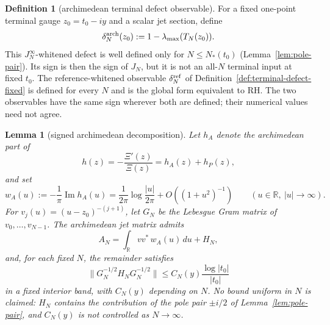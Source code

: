 \documentclass[11pt]{amsart}
\newtheorem{lemma}[theorem]{Lemma}
\theoremstyle{definition}
\newtheorem{definition}[theorem]{Definition}
\theoremstyle{remark}
\theoremstyle{definition}
\renewcommand{\Im}{\operatorname{Im}}
\newcommand{\R}{\mathbb{R}}
\begin{document}
\begin{definition}[archimedean terminal defect observable]\label{def:terminal-defect}
For a fixed one-point terminal gauge $z_0=t_0-iy$ and a scalar jet section, define
\[
   \delta_N^{\rm arch}(z_0):=1-\lambda_{\max}(T_N(z_0)).
\]
This $J_N^\infty$-whitened defect is well defined only for $N\le N_*(t_0)$
(Lemma~\ref{lem:pole-pair}).  Its sign is then the sign of $J_N$, but it is not an all-$N$ terminal
input at fixed $t_0$.  The reference-whitened observable $\delta_N^{\rm ref}$ of
Definition~\ref{def:terminal-defect-fixed} is defined for every $N$ and is the global form equivalent
to RH.  The two observables have the same sign wherever both are defined; their numerical values need
not agree.
\end{definition}

\begin{lemma}[signed archimedean decomposition]\label{lem:signed-arch}
Let $h_A$ denote the archimedean part of
\[
   h(z)=-\frac{\Xi'(z)}{\Xi(z)}=h_A(z)+h_P(z),
\]
and set
\[
   w_A(u):=-\frac1\pi\Im h_A(u)
   =
   \frac1{2\pi}\log\frac{|u|}{2\pi}+O((1+u^2)^{-1})
   \qquad (u\in\R,\ |u|\to\infty).
\]
For $v_j(u)=(u-z_0)^{-(j+1)}$, let $G_N$ be the Lebesgue Gram matrix of
$v_0,\ldots,v_{N-1}$.  The archimedean jet matrix admits
\[
   A_N=\int_\R vv^*\,w_A(u)\,du+H_N,
\]
and, for each fixed $N$, the remainder satisfies
\[
   \|G_N^{-1/2}H_NG_N^{-1/2}\|
   \le C_N(y)\frac{\log |t_0|}{|t_0|}
\]
in a fixed interior band, with $C_N(y)$ depending on $N$.  No bound uniform in $N$ is claimed: $H_N$ contains the
contribution of the pole pair $\pm i/2$ of Lemma~\ref{lem:pole-pair}, and $C_N(y)$ is not controlled
as $N\to\infty$.
\end{lemma}
\end{document}

